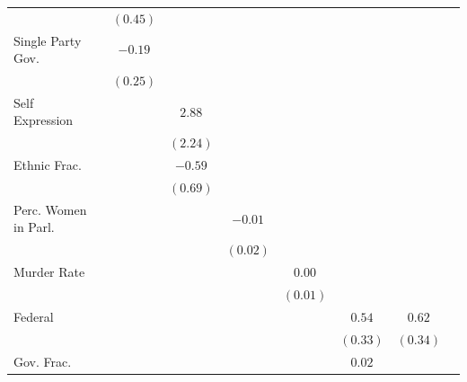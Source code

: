 \documentclass[a4paper]{article}\usepackage[]{graphicx}\usepackage[]{color}
\begin{document}
\begin{table}
\begin{center}
{\begin{tabular}{l c c c c c c c c }
                        &               & $(0.45)$      &              &               &               &               &               &               \\
Single Party Gov.       &               & $-0.19$       &              &               &               &               &               &               \\
                        &               & $(0.25)$      &              &               &               &               &               &               \\
Self Expression         &               &               & $2.88$       &               &               &               &               &               \\
                        &               &               & $(2.24)$     &               &               &               &               &               \\
Ethnic Frac.            &               &               & $-0.59$      &               &               &               &               &               \\
                        &               &               & $(0.69)$     &               &               &               &               &               \\
Perc. Women in Parl.    &               &               &              & $-0.01$       &               &               &               &               \\
                        &               &               &              & $(0.02)$      &               &               &               &               \\
Murder Rate             &               &               &              &               & $0.00$        &               &               &               \\
                        &               &               &              &               & $(0.01)$      &               &               &               \\
Federal                 &               &               &              &               &               & $0.54$        & $0.62$        &               \\
                        &               &               &              &               &               & $(0.33)$      & $(0.34)$      &               \\
Gov. Frac.              &               &               &              &               &               & $0.02$        &               &               \\

\end{tabular}}
\end{center}
\end{table}
\end{document}
